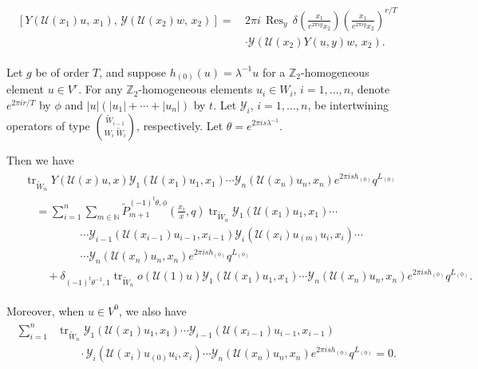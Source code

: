 \documentclass[10pt,a4paper]{amsart}
\begin{document}
\begin{align}\label{coorcha1}
\begin{split}
\left[Y\left(\mathcal{U}(x_{1})u,\, x_{1}\right),\, 
\mathcal{Y}\left(\mathcal{U}(x_{2})w,\, x_{2}\right)\right]
=\, & 2\pi i\, \operatorname{Res}_{y}\, 
\delta\left(\frac{x_{1}}{e^{2\pi i y}x_{2}}\right)
\left(\frac{x_{1}}{e^{2\pi i y}x_{2}}\right)^{r/T} \\
& \cdot \mathcal{Y}\left(\mathcal{U}(x_{2})Y(u,y)w,\, x_{2}\right).
\end{split}
\end{align}

\begin{proposition}\label{iffq1}
Let $g$ be of order $T$, and suppose $h_{(0)}(u) = \lambda^{-1} u$ for a $\mathbb{Z}_{2}$-homogeneous element $u \in V^{r}$. For any $\mathbb{Z}_{2}$-homogeneous elements $u_i \in W_i$, $i = 1, \ldots, n$, denote $e^{2\pi i r/T}$ by $\phi$ and $|u|(|u_1| + \cdots + |u_n|)$ by $t$. Let $\mathcal{Y}_i$, $i = 1, \ldots, n$, be intertwining operators of type $\binom{\tilde{W}_{i-1}}{W_i\; \tilde{W}_{i}}$, respectively. Let $\theta = e^{2\pi i s \lambda^{-1}}$.

Then we have
\begin{align}\label{iffq2}
\begin{split}
&\operatorname{tr}_{\tilde{W}_n}Y(\mathcal{U}(x)u,x)\mathcal{Y}_1(\mathcal{U}(x_1)u_1,x_1) \cdots \mathcal{Y}_n(\mathcal{U}(x_n)u_n,x_n) e^{2\pi i s h_{(0)}} q^{L_{(0)}} \\
&\quad= \sum_{i=1}^{n} \sum_{m \in \mathbb{N}} \tilde{P}_{m+1}^{(-1)^{t} \theta, \phi}\left( \frac{x_i}{x}, q \right) \operatorname{tr}_{\tilde{W}_n} \mathcal{Y}_1(\mathcal{U}(x_1)u_1,x_1) \cdots \\
&\quad\quad\quad\quad\quad \cdots \mathcal{Y}_{i-1}(\mathcal{U}(x_{i-1})u_{i-1},x_{i-1}) \mathcal{Y}_i(\mathcal{U}(x_i) u_{(m)} u_i, x_i) \cdots \\
&\quad\quad\quad\quad\quad \cdots \mathcal{Y}_n(\mathcal{U}(x_n)u_n,x_n) e^{2\pi i s h_{(0)}} q^{L_{(0)}} \\
&\quad\quad + \delta_{(-1)^t \theta^{-1}, 1} \operatorname{tr}_{\tilde{W}_n} o(\mathcal{U}(1) u) \mathcal{Y}_1(\mathcal{U}(x_1)u_1,x_1) \cdots \mathcal{Y}_n(\mathcal{U}(x_n)u_n,x_n) e^{2\pi i s h_{(0)}} q^{L_{(0)}}.
\end{split}
\end{align}

Moreover, when $u \in V^0$, we also have
\begin{align}\label{iffq8}
\begin{split}
\sum_{i=1}^{n} & \operatorname{tr}_{\tilde{W}_n} \mathcal{Y}_1(\mathcal{U}(x_1)u_1,x_1) \cdots \mathcal{Y}_{i-1}(\mathcal{U}(x_{i-1})u_{i-1},x_{i-1}) \\
&\quad\quad \cdot \mathcal{Y}_i(\mathcal{U}(x_i) u_{(0)} u_i, x_i) \cdots \mathcal{Y}_n(\mathcal{U}(x_n)u_n,x_n) e^{2\pi i s h_{(0)}} q^{L_{(0)}} = 0.
\end{split}
\end{align}
\end{proposition}
\end{document}
